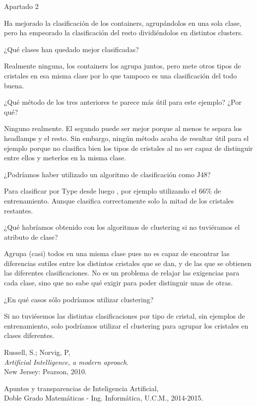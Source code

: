 \documentclass[11pt, a4paper, spanish, openright, twoside]{book}
\begin{document}
\begin{section}{Apartado 2}
\begin{itemize}
	Ha mejorado la clasificación de los containers, agrupándolos en una sola clase, pero ha empeorado la clasificación del resto dividiéndolos en distintos clusters.

	¿Qué clases han quedado mejor clasificadas?
	
	Realmente ninguna, los containers los agrupa juntos, pero mete otros tipos de cristales en esa misma clase por lo que tampoco es una clasificación del todo buena.

	¿Qué método de los tres anteriores te parece más útil para este ejemplo? ¿Por qué? 

	Ninguno realmente. El segundo puede ser mejor porque al menos te separa los headlamps y el resto. Sin embargo, ningún método acaba de resultar útil para el ejemplo porque 
	no clasifica bien los tipos de cristales al no ser capaz de distinguir entre ellos y meterlos en la misma clase.

	¿Podríamos haber utilizado un algoritmo de clasificación como J48? 

	Para clasificar por Type desde luego ,  por ejemplo utilizando el 66\% de entrenamiento. Aunque clasifica correctamente solo la mitad de los cristales restantes.

	¿Qué habríamos obtenido con los algoritmos de clustering si no tuviéramos el atributo de clase?

	Agrupa (casi) todos en una misma clase pues no es capaz de encontrar las diferencias sutiles entre los distintos cristales que se dan, y de las que se obtienen las diferentes clasificaciones. 
	No es un problema de relajar las exigencias para cada clase, sino que no sabe qué exigir para poder distinguir unas de otras.

	 ¿En qué casos sólo podríamos utilizar clustering?
	
	Si no tuviésemos las distintas clasificaciones por tipo de cristal, sin ejemplos de entrenamiento, solo podríamos utilizar el clustering para agrupar los cristales en clases diferentes.
	\end{itemize}
\end{section}

	
\begin{thebibliography}{9}

	Russell, S.; Norvig, P, \\
	\emph{Artificial Intelligence, a modern aproach}.\\
	New Jersey: Pearson, 2010.
	
	Apuntes y transparencias de Inteligencia Artificial, \\
	Doble Grado Matemáticas - Ing. Informática, U.C.M., 2014-2015.

\end{thebibliography}
\end{document}
